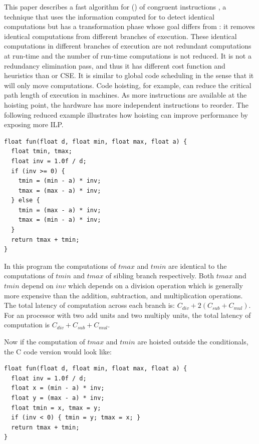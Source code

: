 \documentclass[sigplan,10pt,review,anonymous]{acmart}\settopmatter{printfolios=true,printccs=false,printacmref=false}
\begin{document}
This paper describes a fast algorithm for \gcm{} (\GCM{}) of congruent
instructions \cite{briggs1997}, a technique that uses the information computed
for \PRE{} to detect identical computations but has a transformation phase whose
goal differs from \PRE{}: it removes identical computations from different
branches of execution.  These identical computations in different branches of
execution are not redundant computations at run-time and the number of run-time
computations is not reduced. It is not a redundancy elimination pass, and thus
it has different cost function and heuristics than \PRE{} or CSE. It is similar
to global code scheduling \cite{dragonbook,click1995global} in the sense that it
will only move computations. Code hoisting, for example, can reduce the critical
path length of execution in \ooo{} machines. As more instructions are available
at the hoisting point, the hardware has more independent instructions to
reorder. The following reduced example illustrates how hoisting can improve
performance by exposing more ILP.

\begin{verbatim}
float fun(float d, float min, float max, float a) {
  float tmin, tmax;
  float inv = 1.0f / d;
  if (inv >= 0) {
    tmin = (min - a) * inv;
    tmax = (max - a) * inv;
  } else {
    tmin = (max - a) * inv;
    tmax = (min - a) * inv;
  }
  return tmax + tmin;
}
\end{verbatim}

In this program the computations of $tmax$ and $tmin$ are identical to the
computations of $tmin$ and $tmax$ of sibling branch respectively. Both $tmax$ and $tmin$
depend on $inv$ which depends on a division operation which is generally more
expensive than the addition, subtraction, and multiplication operations. The
total latency of computation across each branch is: $C_{div} + 2(C_{sub} + C_{mul})$.
For an \ooo{} processor with two add units and two multiply
units, the total latency of computation is $C_{div} + C_{sub} + C_{mul}$.

Now if the computation of $tmax$ and $tmin$ are hoisted outside the
conditionals, the C code version would look like:
\begin{verbatim}
float fun(float d, float min, float max, float a) {
  float inv = 1.0f / d;
  float x = (min - a) * inv;
  float y = (max - a) * inv;
  float tmin = x, tmax = y;
  if (inv < 0) { tmin = y; tmax = x; }
  return tmax + tmin;
}
\end{verbatim}
\end{document}
